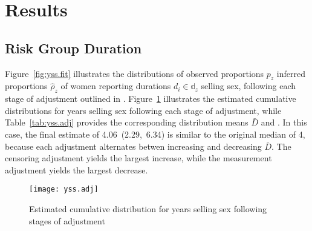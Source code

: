 \section{Results}
\subsection{Risk Group Duration}\label{res.yss}
Figure~\ref{fig:yss.fit} illustrates the distributions of
observed proportions $p_z$ \vs inferred proportions $\hat{\rho}_z$ of women  %
reporting durations $d_i \in \mathbb{d}_z$ selling sex,
following each stage of adjustment outlined in .
Figure~\ref{fig:yss.adj} illustrates
the estimated cumulative distributions for years selling sex following each stage of adjustment,
while Table~\ref{tab:yss.adj} provides the corresponding distribution means $\bar{D}$ and \ci.
In this case, the final estimate of 4.06~(2.29,~6.34) is similar to the original median of 4,  %
because each adjustment alternates betwen increasing and decreasing $\bar{D}$.  %
The censoring adjustment yields the largest increase, while
the measurement adjustment yields the largest decrease.
\begin{figure}[h]
  \centering\texttt{[image: yss.adj]}
  \caption{Estimated cumulative distribution for years selling sex
    following stages of adjustment}
  \label{fig:yss.adj}
\end{figure}

